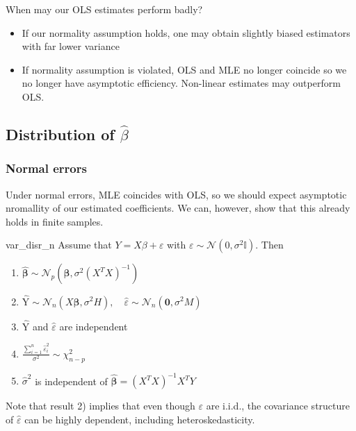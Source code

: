 \documentclass[11pt, %
	oneside, %
	english, %
	onehalfspacing, %
	]{article} %
\numberwithin{equation}{section}
\begin{document}
When may our OLS estimates perform badly?

\begin{itemize}
    \item If our normality assumption holds, one may obtain slightly biased estimators with far lower variance
    \item If normality assumption is violated, OLS and MLE no longer coincide so we no longer have asymptotic efficiency. Non-linear estimates may outperform OLS.
\end{itemize}


\subsection{Distribution of $\hat{\beta}$}

\subsubsection*{Normal errors}

Under normal errors, MLE coincides with OLS, so we should expect asymptotic nromallity of our estimated coefficients. We can, however, show that this already holds in finite samples.


\begin{proposition}{}{var_disr_n}
    Assume that $Y = X \beta + \varepsilon$ with $\varepsilon \sim \mathcal{N}(0, \sigma^2 \mathbb{I})$. Then

    \begin{enumerate}
        \item $\widehat{\mathbf{\beta}} \sim \mathcal{N}_p\left(\mathbf{\beta}, \sigma^2\left(X^T X\right)^{-1}\right) \quad$
        \item $\widehat{\mathrm{Y}} \sim \mathcal{N}_n\left(X \mathbf{\beta}, \sigma^2 H\right), \quad \widehat{\varepsilon} \sim \mathcal{N}_n\left(\mathbf{0}, \sigma^2 M\right)$
        \item $\widehat{\mathrm{Y}}$ and $\widehat{\varepsilon}$ are independent
        \item $\frac{\sum_{i=1}^n \hat{\varepsilon}_i^2}{\sigma^2} \sim \chi_{n-p}^2$
        \item $\widehat{\sigma}^2$ is independent of $\widehat{\mathbf{\beta}}=\left(X^T X\right)^{-1} X^T Y$
    \end{enumerate}
\end{proposition}

Note that result 2) implies that even though $\varepsilon$ are i.i.d., the covariance structure of $\hat{\varepsilon}$ can be highly dependent, including heteroskedasticity.
\end{document}
